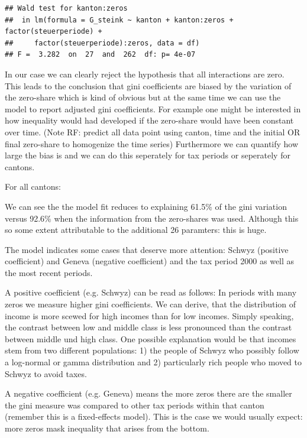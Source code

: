 \documentclass[twoside]{article}\usepackage[]{graphicx}\usepackage[]{color}
\makeatletter
\newenvironment{kframe}{%
 \def\at@end@of@kframe{}%
 \ifinner\ifhmode%
  \def\at@end@of@kframe{\end{minipage}}%
  \begin{minipage}{\columnwidth}%
 \fi\fi%
 \def\FrameCommand##1{\hskip\@totalleftmargin \hskip-\fboxsep
 \colorbox{shadecolor}{##1}\hskip-\fboxsep
     \hskip-\linewidth \hskip-\@totalleftmargin \hskip\columnwidth}%
 \MakeFramed {\advance\hsize-\width
   \@totalleftmargin\z@ \linewidth\hsize
   \@setminipage}}%
 {\par\unskip\endMakeFramed%
 \at@end@of@kframe}
\newenvironment{knitrout}{}{} %
\makeatother
\begin{document}
\begin{multicols}{2}
\begin{knitrout}
\color{fgcolor}\begin{kframe}
\begin{verbatim}
## Wald test for kanton:zeros
##  in lm(formula = G_steink ~ kanton + kanton:zeros + factor(steuerperiode) + 
##     factor(steuerperiode):zeros, data = df)
## F =  3.282  on  27  and  262  df: p= 4e-07
\end{verbatim}
\end{kframe}
\end{knitrout}


In our case we can clearly reject the hypothesis that all interactions are zero. This leads to the conclusion  that gini coefficients are biased by the variation of the zero-share which is kind of obvious but at the same time we can use the model to report adjusted gini coefficients. For example one might be interested in how inequality would had developed if the zero-share would have been constant over time. (Note RF: predict all data point using canton, time and the initial OR final zero-share to homogenize the time series)
Furthermore we can quantify how large the bias is and we can do this seperately for tax periods or seperately for cantons. 

For all cantons:




We can see the the model fit reduces to explaining 61.5\% of the gini variation versus 92.6\% when the information from the zero-shares was used. Although this so some extent attributable to the additional 26 paramters: this is huge. 

The model indicates some cases that deserve more attention: Schwyz (positive coefficient) and Geneva (negative coefficient) and the tax period 2000 as well as the most recent periods.

A positive coefficient (e.g. Schwyz) can be read as follows: In periods with many zeros we measure higher gini coefficients. We can derive, that the distribution of income is more scewed for high incomes than for low incomes. Simply speaking, the contrast between low and middle class is less pronounced than the contrast between middle und high class. One possible explanation would be that incomes stem from two different populations: 1) the people of Schwyz who possibly follow a log-normal or gamma distribution and 2) particularly rich people who moved to Schwyz to avoid taxes. 

A negative coefficient (e.g. Geneva) means the more zeros there are the smaller the gini measure was compared to other tax periods within that canton (remember this is a fixed-effects model). This is the case we would usually expect: more zeros mask inequality that arises from the bottom.


\end{multicols}
\end{document}
